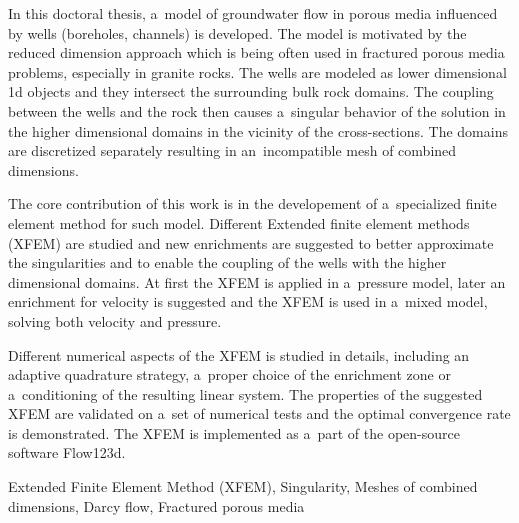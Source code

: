 \documentclass[bibliography=totocnumbered,dvipsnames,FM,Dis, EN]{tulthesis_autoreferat}
\begin{document}
\begin{abstractEN}
In this doctoral thesis, a~model of groundwater flow in porous media influenced by wells (boreholes, channels) is developed.
The model is motivated by the reduced dimension approach which is being often used in fractured porous media problems, especially in granite rocks.
The wells are modeled as lower dimensional 1d objects and they intersect the surrounding bulk rock domains.
The coupling between the wells and the rock then causes a~singular behavior of the solution in the higher dimensional domains
in the vicinity of the cross-sections. The domains are discretized separately resulting in an~incompatible mesh of combined dimensions.

The core contribution of this work is in the developement of a~specialized finite element method for such model.
Different Extended finite element methods (XFEM) are studied and new enrichments are suggested to better
approximate the singularities and to enable the coupling of the wells with the higher dimensional domains.
At first the XFEM is applied in a~pressure model, later an enrichment for velocity
is suggested and the XFEM is used in a~mixed model, solving both velocity and pressure.

Different numerical aspects of the XFEM is studied in details, including an adaptive quadrature strategy,
a~proper choice of the enrichment zone or a~conditioning of the resulting linear system.
The properties of the suggested XFEM are validated on a~set of numerical tests and the optimal convergence
rate is demonstrated. The XFEM is implemented as a~part of the open-source software Flow123d.

\end{abstractEN}

\begin{keywordsEN}
Extended Finite Element Method (XFEM), Singularity, Meshes of combined dimensions,
Darcy flow, Fractured porous media
\end{keywordsEN}

\clearpage



\tableofcontents
\clearpage



% 
% 



\begingroup
\let\clearpage\relax
\listoffigures
\listoftables
\listofgraphs

\endgroup
\clearpage
\end{document}

